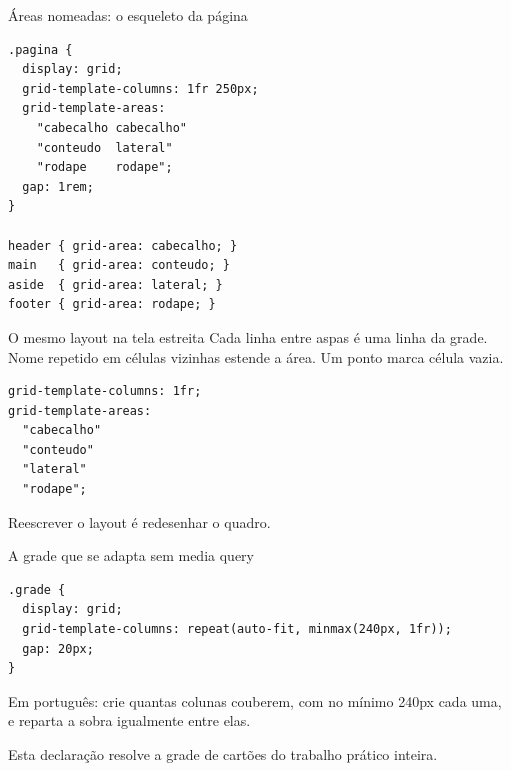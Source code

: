 \documentclass{beamer}
\begin{document}
\begin{frame}[fragile]{Áreas nomeadas: o esqueleto da página}
	\begin{verbatim}
.pagina {
  display: grid;
  grid-template-columns: 1fr 250px;
  grid-template-areas:
    "cabecalho cabecalho"
    "conteudo  lateral"
    "rodape    rodape";
  gap: 1rem;
}

header { grid-area: cabecalho; }
main   { grid-area: conteudo; }
aside  { grid-area: lateral; }
footer { grid-area: rodape; }
  \end{verbatim}
\end{frame}

\begin{frame}[fragile]{O mesmo layout na tela estreita}
	Cada linha entre aspas é uma linha da grade. Nome repetido em células vizinhas
	estende a área. Um ponto marca célula vazia.

	\begin{verbatim}
grid-template-columns: 1fr;
grid-template-areas:
  "cabecalho"
  "conteudo"
  "lateral"
  "rodape";
  \end{verbatim}

	\vspace{0.2cm}
	Reescrever o layout é redesenhar o quadro.
\end{frame}

\begin{frame}[fragile]{A grade que se adapta sem media query}
	\begin{verbatim}
.grade {
  display: grid;
  grid-template-columns: repeat(auto-fit, minmax(240px, 1fr));
  gap: 20px;
}
  \end{verbatim}

	\vspace{0.3cm}
	Em português: crie quantas colunas couberem, com no mínimo 240px cada uma, e
	reparta a sobra igualmente entre elas.

	\vspace{0.3cm}
	Esta declaração resolve a grade de cartões do trabalho prático inteira.
\end{frame}
\end{document}

